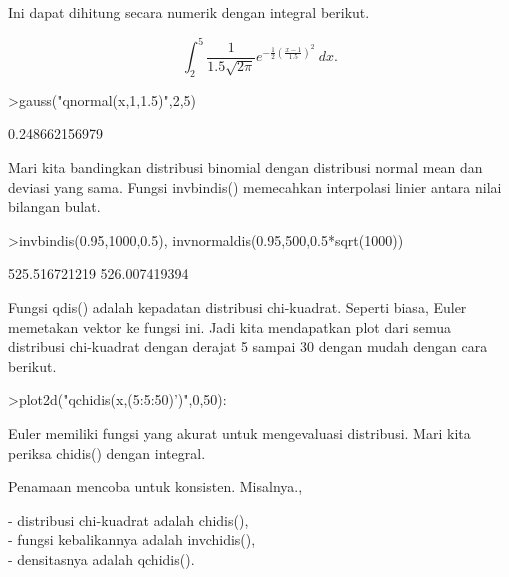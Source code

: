 \documentclass[a4paper,10pt]{article}
\begin{document}
\begin{eulernotebook}
\begin{eulercomment}
\begin{eulercomment}
\begin{eulercomment}
\begin{eulercomment}
\begin{eulercomment}
\begin{eulercomment}
\begin{eulercomment}
\begin{eulercomment}
\begin{eulercomment}
\begin{eulercomment}
\begin{eulercomment}
\begin{eulercomment}
\begin{eulercomment}
\begin{eulercomment}
\begin{eulercomment}
\begin{eulercomment}
\begin{eulercomment}
\begin{eulercomment}
\begin{euleroutput}
\end{euleroutput}
\begin{eulercomment}
Ini dapat dihitung secara numerik dengan integral berikut.\\
\end{eulercomment}
\begin{eulerformula}
\[
\int_2^5 \frac{1}{1.5\sqrt{2\pi}}e^{-\frac{1}{2}(\frac{x-1}{1.5})^2}\ dx .
\]
\end{eulerformula}
\begin{eulerprompt}
>gauss("qnormal(x,1,1.5)",2,5)
\end{eulerprompt}
\begin{euleroutput}
  0.248662156979
\end{euleroutput}
\begin{eulercomment}
Mari kita bandingkan distribusi binomial dengan distribusi normal mean
dan deviasi yang sama. Fungsi invbindis() memecahkan interpolasi
linier antara nilai bilangan bulat.
\end{eulercomment}
\begin{eulerprompt}
>invbindis(0.95,1000,0.5), invnormaldis(0.95,500,0.5*sqrt(1000))
\end{eulerprompt}
\begin{euleroutput}
  525.516721219
  526.007419394
\end{euleroutput}
\begin{eulercomment}
Fungsi qdis() adalah kepadatan distribusi chi-kuadrat. Seperti biasa,
Euler memetakan vektor ke fungsi ini. Jadi kita mendapatkan plot dari
semua distribusi chi-kuadrat dengan derajat 5 sampai 30 dengan mudah
dengan cara berikut.
\end{eulercomment}
\begin{eulerprompt}
>plot2d("qchidis(x,(5:5:50)')",0,50):
\end{eulerprompt}
\begin{eulercomment}
Euler memiliki fungsi yang akurat untuk mengevaluasi distribusi. Mari
kita periksa chidis() dengan integral.

Penamaan mencoba untuk konsisten. Misalnya.,

- distribusi chi-kuadrat adalah chidis(),\\
- fungsi kebalikannya adalah invchidis(),\\
- densitasnya adalah qchidis().


\end{eulercomment}
\end{eulercomment}
\end{eulercomment}
\end{eulercomment}
\end{eulercomment}
\end{eulercomment}
\end{eulercomment}
\end{eulercomment}
\end{eulercomment}
\end{eulercomment}
\end{eulercomment}
\end{eulercomment}
\end{eulercomment}
\end{eulercomment}
\end{eulercomment}
\end{eulercomment}
\end{eulercomment}
\end{eulercomment}
\end{eulercomment}
\end{eulernotebook}
\end{document}
